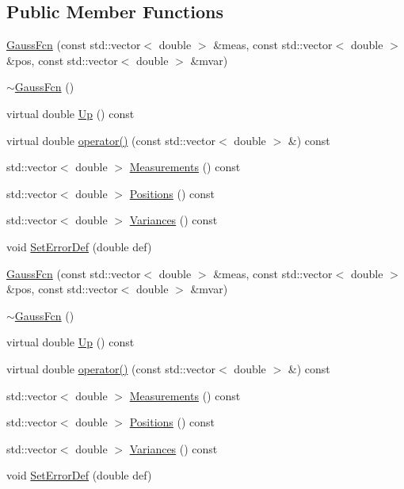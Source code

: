 \subsection*{Public Member Functions}
\begin{DoxyCompactItemize}
\item 
\mbox{\hyperlink{classROOT_1_1Minuit2_1_1GaussFcn_a2499f947aef750f0808b7954f609b368}{Gauss\+Fcn}} (const std\+::vector$<$ double $>$ \&meas, const std\+::vector$<$ double $>$ \&pos, const std\+::vector$<$ double $>$ \&mvar)
\item 
\mbox{\hyperlink{classROOT_1_1Minuit2_1_1GaussFcn_a509b50db5527c7ff908b4d6db63b38c8}{$\sim$\+Gauss\+Fcn}} ()
\item 
virtual double \mbox{\hyperlink{classROOT_1_1Minuit2_1_1GaussFcn_a7e73468f853c287df3b5da240c3b5bb5}{Up}} () const
\item 
virtual double \mbox{\hyperlink{classROOT_1_1Minuit2_1_1GaussFcn_a00140c21f302cdf076d306ac76299d1a}{operator()}} (const std\+::vector$<$ double $>$ \&) const
\item 
std\+::vector$<$ double $>$ \mbox{\hyperlink{classROOT_1_1Minuit2_1_1GaussFcn_a61ee040fbdb752b6629de59b8b512cf5}{Measurements}} () const
\item 
std\+::vector$<$ double $>$ \mbox{\hyperlink{classROOT_1_1Minuit2_1_1GaussFcn_a7098b4a70f063917479335d5f1d7473a}{Positions}} () const
\item 
std\+::vector$<$ double $>$ \mbox{\hyperlink{classROOT_1_1Minuit2_1_1GaussFcn_a477d37158239fe260003624d12e8379a}{Variances}} () const
\item 
void \mbox{\hyperlink{classROOT_1_1Minuit2_1_1GaussFcn_ad6ab65c15a43f72db27fd6ddf26486f9}{Set\+Error\+Def}} (double def)
\item 
\mbox{\hyperlink{classROOT_1_1Minuit2_1_1GaussFcn_a2499f947aef750f0808b7954f609b368}{Gauss\+Fcn}} (const std\+::vector$<$ double $>$ \&meas, const std\+::vector$<$ double $>$ \&pos, const std\+::vector$<$ double $>$ \&mvar)
\item 
\mbox{\hyperlink{classROOT_1_1Minuit2_1_1GaussFcn_a509b50db5527c7ff908b4d6db63b38c8}{$\sim$\+Gauss\+Fcn}} ()
\item 
virtual double \mbox{\hyperlink{classROOT_1_1Minuit2_1_1GaussFcn_a7e73468f853c287df3b5da240c3b5bb5}{Up}} () const
\item 
virtual double \mbox{\hyperlink{classROOT_1_1Minuit2_1_1GaussFcn_a31e8417ee8733da39a19db774b5c92f9}{operator()}} (const std\+::vector$<$ double $>$ \&) const
\item 
std\+::vector$<$ double $>$ \mbox{\hyperlink{classROOT_1_1Minuit2_1_1GaussFcn_a61ee040fbdb752b6629de59b8b512cf5}{Measurements}} () const
\item 
std\+::vector$<$ double $>$ \mbox{\hyperlink{classROOT_1_1Minuit2_1_1GaussFcn_a7098b4a70f063917479335d5f1d7473a}{Positions}} () const
\item 
std\+::vector$<$ double $>$ \mbox{\hyperlink{classROOT_1_1Minuit2_1_1GaussFcn_a477d37158239fe260003624d12e8379a}{Variances}} () const
\item 
void \mbox{\hyperlink{classROOT_1_1Minuit2_1_1GaussFcn_ad6ab65c15a43f72db27fd6ddf26486f9}{Set\+Error\+Def}} (double def)
\end{DoxyCompactItemize}


